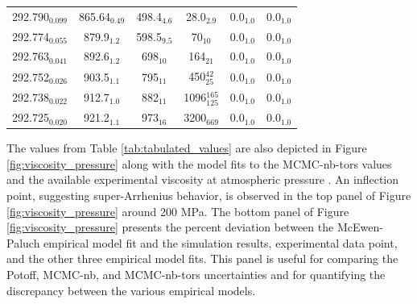 \documentclass[preprint,review,12pt]{elsarticle}
\begin{document}
\begin{table}[htb!]
\begin{center}
\begin{tabular}{|c|c|c|c|c|c|}
				292.790$_{0.099}$ & 	865.64$_{0.49}$ & 	498.4$_{4.6}$ & 	28.0$_{2.9}$ & 	0.0$_{1.0}$ & 	0.0$_{1.0}$ \\
				292.774$_{0.055}$ & 	879.9$_{1.2}$ & 	598.5$_{9.5}$ & 	70$_{10}$ & 	0.0$_{1.0}$ & 	0.0$_{1.0}$ \\
				292.763$_{0.041}$ & 	892.6$_{1.2}$ & 	698$_{10}$ & 	164$_{21}$ & 	0.0$_{1.0}$ & 	0.0$_{1.0}$ \\
				292.752$_{0.026}$ & 	903.5$_{1.1}$ & 	795$_{11}$ & 	450$^{42}_{25}$ & 	0.0$_{1.0}$ & 	0.0$_{1.0}$ \\
				292.738$_{0.022}$ & 	912.7$_{1.0}$ & 	882$_{11}$ & 	1096$^{165}_{125}$ & 	0.0$_{1.0}$ & 	0.0$_{1.0}$ \\
				292.725$_{0.020}$ & 	921.2$_{1.1}$ & 	973$_{16}$ & 	3200$_{669}$ & 	0.0$_{1.0}$ & 	0.0$_{1.0}$ \\
				\hline
			\end{tabular}
		\end{center} 
	\end{table}
	
	The values from Table \ref{tab:tabulated_values} are also depicted in Figure \ref{fig:viscosity_pressure} along with the model fits to the MCMC-nb-tors values and the available experimental viscosity at atmospheric pressure \cite{TDE}. An inflection point, suggesting super-Arrhenius behavior, is observed in the top panel of Figure \ref{fig:viscosity_pressure} around 200 MPa. The bottom panel of Figure \ref{fig:viscosity_pressure} presents the percent deviation between the McEwen-Paluch empirical model fit and the simulation results, experimental data point, and the other three empirical model fits. This panel is useful for comparing the Potoff, MCMC-nb, and MCMC-nb-tors uncertainties and for quantifying the discrepancy between the various empirical models.
	
\end{document}
